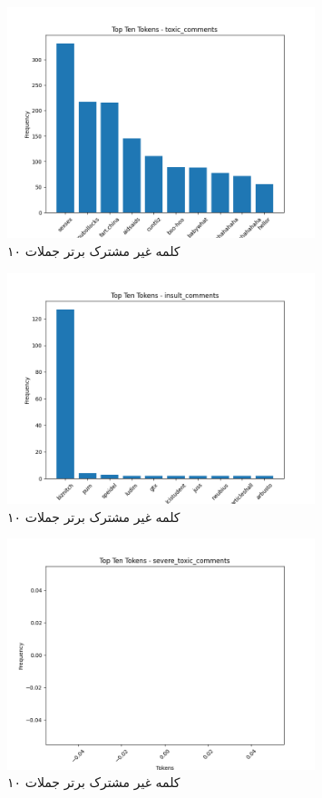 \begin{figure}
  \centering
  \includegraphics[width=0.8\textwidth]{stats/top_ten_tokens_toxic_comments.png}
  \caption{۱۰ کلمه غیر مشترک برتر جملات }
  \label{fig:unique_uncommon_words_count}
\end{figure}

\begin{figure}
  \centering
  \includegraphics[width=0.8\textwidth]{stats/top_ten_tokens_insult_comments.png}
  \caption{۱۰ کلمه غیر مشترک برتر جملات }
  \label{fig:unique_common_words_total}
\end{figure}

\begin{figure}
  \centering
  \includegraphics[width=0.8\textwidth]{stats/top_ten_tokens_severe_toxic_comments.png}
  \caption{۱۰ کلمه غیر مشترک برتر جملات }
  \label{fig:unique_uncommon_words_count}
\end{figure}

